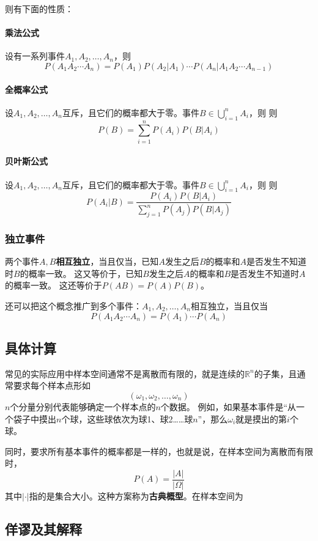 \documentclass[UTF8, a4paper]{ctexart}
\newcommand*{\reals}{\mathbb{R}}
\begin{document}
则有下面的性质：
\paragraph{乘法公式} 设有一系列事件$A_1, A_2, \ldots, A_n$，则
\[
    P(A_1 A_2 \cdots A_n) = P(A_1) P(A_2|A_1) \cdots P(A_n | A_1 A_2 \cdots A_{n-1})
\]

\paragraph{全概率公式} 设$A_1, A_2, \ldots, A_n$互斥，且它们的概率都大于零。事件$B \in \bigcup_{i=1}^n A_i$，则
则
\[
    P(B) = \sum_{i=1}^n P(A_i) P(B | A_i)
\]

\paragraph{贝叶斯公式} 设$A_1, A_2, \ldots, A_n$互斥，且它们的概率都大于零。事件$B \in \bigcup_{i=1}^n A_i$，则
则
\[
    P(A_i | B) = \frac{P(A_i) P(B|A_i)}{\sum_{j=1}^n P(A_j) P(B|A_j)}
\]

\subsubsection{独立事件}

两个事件$A, B$\textbf{相互独立}，当且仅当，已知$A$发生之后$B$的概率和$A$是否发生不知道时$B$的概率一致。
这又等价于，已知$B$发生之后$A$的概率和$B$是否发生不知道时$A$的概率一致。
这还等价于$P(AB)=P(A)P(B)$。

还可以把这个概念推广到多个事件：$A_1, A_2, \ldots, A_n$\textbf{}{相互独立}，当且仅当
\[
    P(A_1 A_2 \cdots A_n) = P(A_1) \cdots P(A_n)
\]

\subsection{具体计算}

常见的实际应用中样本空间通常不是离散而有限的，就是连续的$\reals^n$的子集，且通常要求每个样本点形如
\[
    (\omega_1, \omega_2, \ldots, \omega_n)
\]
$n$个分量分别代表能够确定一个样本点的$n$个数据。
例如，如果基本事件是“从一个袋子中摸出$n$个球，这些球依次为球1、球2……球$n$”，那么$\omega_i$就是摸出的第$i$个球。

同时，要求所有基本事件的概率都是一样的，也就是说，在样本空间为离散而有限时，
\[
    P(A) = \frac{|A|}{|\Omega|}
\]
其中$|\cdot|$指的是集合大小。这种方案称为\textbf{古典概型}。在样本空间为

\subsection{佯谬及其解释}
\end{document}
